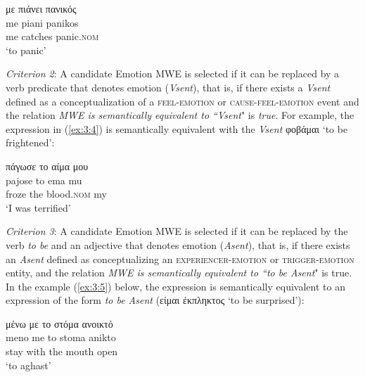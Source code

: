 \documentclass[output=paper]{langsci/langscibook}
\begin{document}
\begin{exe}
\ex \label{ex:3:3}
\glll με πιάνει πανικός \\
me piani panikos\\
me catches panic.\textsc{nom}\\
\glt %
‘to panic’
\end{exe}


\textit{Criterion 2}: A candidate Emotion MWE is selected if it can be replaced by a verb
predicate that denotes emotion (\textit{Vsent}), that is, if there
exists a \textit{Vsent} defined as a conceptualization of a
\textsc{feel-emotion} or
\textsc{cause-feel-emotion} event and the relation
\textit{MWE is semantically equivalent to \textnormal{``}Vsent}" is \textit{true}. For
example, the expression in (\ref{ex:3:4}) is semantically equivalent with the
\textit{Vsent} φοβάμαι ‘to be frightened’:

\begin{exe}
\ex \label{ex:3:4}
\glll πάγωσε το αίμα μου \\
pajose to ema mu\\
froze the blood.\textsc{nom} my\\
\glt %
‘I was terrified’
\end{exe}

\textit{Criterion 3}: A candidate Emotion MWE is selected if it can be replaced by the verb
\textit{to be} and an adjective that denotes emotion
(\textit{Asent}), that is, if there exists an \textit{Asent} defined as
conceptualizing an
\textsc{experiencer}-\textsc{emotion}
or
\textsc{trigger}-\textsc{emotion}
entity, and the relation \textit{MWE is semantically equivalent to \textnormal{``}to be Asent}" is true.
In the example (\ref{ex:3:5}) below, the expression is semantically equivalent to
an expression of the form \textit{to be Asent
}(είμαι έκπληκτος ‘to be surprised’):

\begin{exe}
\ex \label{ex:3:5}
\glll μένω με το στόμα ανοικτό \\
meno me to stoma anikto\\
stay with the mouth open\\
\glt %
‘to aghast’
\end{exe}
\end{document}
